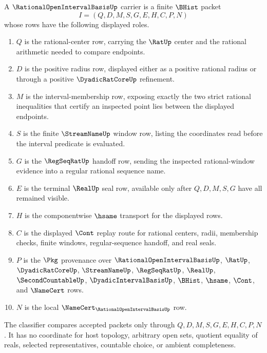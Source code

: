 \begin{definition}
\label{def:rational-open-interval-basis-carrier}
A $\RationalOpenIntervalBasisUp$ carrier is a finite $\BHist$ packet
$$
I=(Q,D,M,S,G,E,H,C,P,N)
$$
whose rows have the following displayed roles.
\begin{enumerate}
\item $Q$ is the rational-center row, carrying the $\RatUp$ center and the rational arithmetic needed to compare endpoints.
\item $D$ is the positive radius row, displayed either as a positive rational radius or through a positive $\DyadicRatCoreUp$ refinement.
\item $M$ is the interval-membership row, exposing exactly the two strict rational inequalities that certify an inspected point lies between the displayed endpoints.
\item $S$ is the finite $\StreamNameUp$ window row, listing the coordinates read before the interval predicate is evaluated.
\item $G$ is the $\RegSeqRatUp$ handoff row, sending the inspected rational-window evidence into a regular rational sequence name.
\item $E$ is the terminal $\RealUp$ seal row, available only after $Q,D,M,S,G$ have all remained visible.
\item $H$ is the componentwise $\hsame$ transport for the displayed rows.
\item $C$ is the displayed $\Cont$ replay route for rational centers, radii, membership checks, finite windows, regular-sequence handoff, and real seals.
\item $P$ is the $\Pkg$ provenance over $\RationalOpenIntervalBasisUp$, $\RatUp$, $\DyadicRatCoreUp$, $\StreamNameUp$, $\RegSeqRatUp$, $\RealUp$, $\SecondCountableUp$, $\DyadicIntervalBasisUp$, $\BHist$, $\hsame$, $\Cont$, and $\NameCert$ rows.
\item $N$ is the local $\NameCert_{\RationalOpenIntervalBasisUp}$ row.
\end{enumerate}
The classifier compares accepted packets only through $Q,D,M,S,G,E,H,C,P,N$. It has no coordinate for host topology, arbitrary open sets, quotient equality of reals, selected representatives, countable choice, or ambient completeness.
\end{definition}


